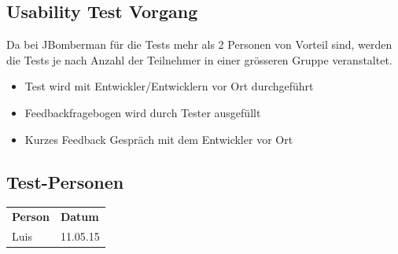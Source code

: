 \documentclass[11pt]{scrartcl}
\begin{document}
\subsection{Usability Test Vorgang}
Da bei JBomberman für die Tests mehr als 2 Personen von Vorteil sind, werden die 
Tests je nach Anzahl der Teilnehmer in einer grösseren Gruppe veranstaltet.
\begin{itemize}
  \item Test wird mit Entwickler/Entwicklern vor Ort durchgeführt
  \item Feedbackfragebogen wird durch Tester ausgefüllt
  \item Kurzes Feedback Gespräch mit dem Entwickler vor Ort
\end{itemize}

\subsection{Test-Personen}
\begin{tabularx}{\linewidth}{l X}
  \bf{Person} & \bf{Datum} \\
  Luis & 11.05.15\\
\end{tabularx}
\newpage
\end{document}
